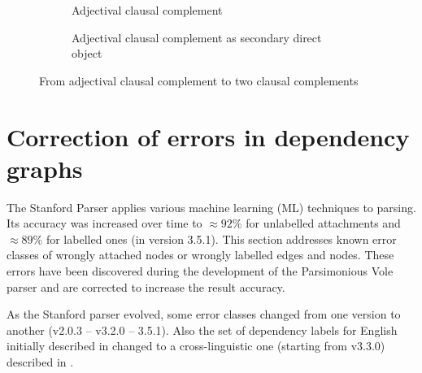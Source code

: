     \begin{figure}[!ht]
    	\begin{subfigure}{0.45\linewidth}
    		\centering
    		\caption{Adjectival clausal complement}
    		\label{fig:xcomp-jj-init}
    	\end{subfigure}
    	\quad
    	\begin{subfigure}{0.45\linewidth}
    		\centering
    		\caption{Adjectival clausal complement as secondary direct object}
    		\label{fig:xcomp-jj-final}
    	\end{subfigure}
    	\caption{From adjectival clausal complement to two clausal complements}
		\label{fig:xcomp-jj-final-final}
    \end{figure}

\section{Correction of errors in dependency graphs}
\label{sec:preprocessing2}

    The Stanford Parser applies various machine learning (ML) techniques to parsing. Its accuracy was increased over time to $\approx92\%$ for unlabelled attachments and $\approx89\%$ for labelled ones (in version 3.5.1). This section addresses known error classes of wrongly attached nodes or wrongly labelled edges and nodes. These errors have been discovered during the development of the Parsimonious Vole parser and are corrected to increase the result accuracy. 

    As the Stanford parser evolved, some error classes changed from one version to another (v2.0.3 -- v3.2.0 -- 3.5.1). Also the set of dependency labels for English initially described in \citet{Marneffe2008, Marneffe2008a} changed to a cross-linguistic one (starting from v3.3.0) described in \citet{Marneffe2014}.

